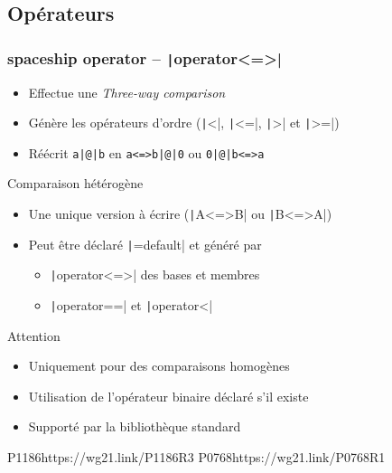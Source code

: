 \documentclass[C++.tex]{subfiles}
\begin{document}
\subsection*{Opérateurs}
\begin{frame}[fragile]
	\frametitle{spaceship operator -- \texttt|operator<=>|}
	\begin{itemize}
		\item Effectue une \og \textit{Three-way comparison}\fg{}
		\item Génère les opérateurs d'ordre (\texttt|<|, \texttt|<=|, \texttt|>| et \texttt|>=|)
		\item Réécrit \texttt{a|@|b} en \texttt{a<=>b|@|0} ou \texttt{0|@|b<=>a}
	\end{itemize}

	\begin{exampleblock}{Comparaison hétérogène}
		\begin{itemize}
			\item Une unique version à écrire (\texttt|A<=>B| ou \texttt|B<=>A|)
		\end{itemize}
	\end{exampleblock}
		
	\begin{itemize}
		\item Peut être déclaré \texttt|=default| et généré par
		\begin{itemize}
			\item \texttt|operator<=>| des bases et membres
			\item \texttt|operator==| et \texttt|operator<|
		\end{itemize}
	\end{itemize}

	\begin{alertblock}{Attention}
		\begin{itemize}
			\item Uniquement pour des comparaisons homogènes
		\end{itemize}
	\end{alertblock}

	\begin{itemize}
		\item Utilisation de l'opérateur binaire déclaré s'il existe


		\item Supporté par la bibliothèque standard
	\end{itemize}

		{P1186}{https://wg21.link/P1186R3}
		{P0768}{https://wg21.link/P0768R1}
\end{frame}
\end{document}
